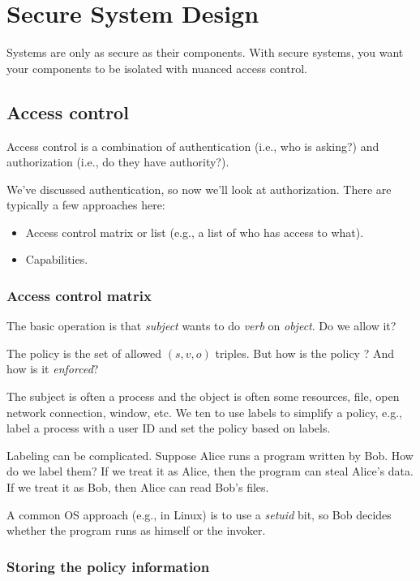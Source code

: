 \documentclass[12pt]{article}
\begin{document}
\section*{Secure System Design}

Systems are only as secure as their components. With secure systems, you want your components to be isolated with nuanced access control.

\subsection*{Access control}

Access control is a combination of authentication (i.e., who is asking?) and authorization (i.e., do they have authority?).

We've discussed authentication, so now we'll look at authorization. There are typically a few approaches here:

\begin{itemize}
\item Access control matrix or list (e.g., a list of who has access to what).
\item Capabilities.
\end{itemize}

\subsubsection*{Access control matrix}

The basic operation is that \textit{subject} wants to do \textit{verb} on \textit{object}. Do we allow it?

The policy is the set of allowed $(s, v, o)$ triples. But how is the policy ? And how is it \textit{enforced}? 

The subject is often a process and the object is often some resources, file, open network connection, window, etc. We ten to use labels to simplify a policy, e.g., label a process with a user ID and set the policy based on labels.

Labeling can be complicated. Suppose Alice runs a program written by Bob. How do we label them? If we treat it as Alice, then the program can steal Alice's data. If we treat it as Bob, then Alice can read Bob's files.

A common OS approach (e.g., in Linux) is to use a \textit{setuid} bit, so Bob decides whether the program runs as himself or the invoker.

\subsubsection*{Storing the policy information}
\end{document}
